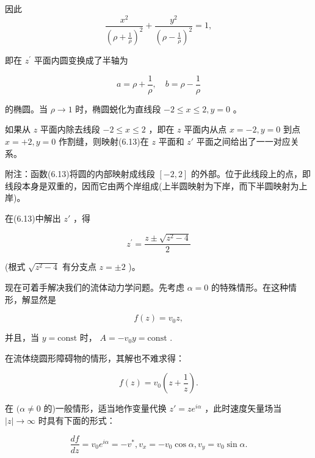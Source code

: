因此
\begin{equation*}
\frac {x ^ {2}}{\left(\rho + \frac {1}{\rho}\right) ^ {2}} + \frac {y ^ {2}}{\left(\rho - \frac {1}{\rho}\right) ^ {2}} = 1,
\end{equation*}

即在 $z^{\prime}$ 平面内圆变换成了半轴为

\begin{equation*}
a = \rho + \frac {1}{\rho}, \quad b = \rho - \frac {1}{\rho}
\end{equation*}

的椭圆。当 $\rho \to 1$ 时，椭圆蜕化为直线段 $-2 \leqslant x \leqslant 2, y = 0$ 。

如果从 $z$ 平面内除去线段 $-2 \leqslant x \leqslant 2$ ，即在 $z$ 平面内从点 $x = -2, y = 0$ 到点 $x = +2, y = 0$ 作割缝，则映射(6.13)在 $z$ 平面和 $z'$ 平面之间给出了一一对应关系。

附注：函数(6.13)将圆的内部映射成线段 $[-2,2]$ 的外部。位于此线段上的点，即线段本身是双重的，因而它由两个岸组成(上半圆映射为下岸，而下半圆映射为上岸)。

在(6.13)中解出 $z'$ ，得

\begin{equation*}
z ^ {\prime} = \frac {z \pm \sqrt {z ^ {2} - 4}}{2}\tag{6.14}
\end{equation*}

(根式 $\sqrt{z^{2}-4}$ 有分支点 $z=\pm2$ )。

现在可着手解决我们的流体动力学问题。先考虑 $\alpha = 0$ 的特殊情形。在这种情形，解显然是

\begin{equation*}
f (z) = v _ {0} z,
\end{equation*}

并且，当 $y = \mathrm{const}$ 时， $A = -v_0y = \mathrm{const}$ .

在流体绕圆形障碍物的情形，其解也不难求得：

\begin{equation*}
f (z) = v _ {0} \left(z + \frac {1}{z}\right).
\end{equation*}

在 $(\alpha \neq 0$ 的)一般情形，适当地作变量代换 $z' = ze^{i\alpha}$ ，此时速度矢量场当 $|z|\to \infty$ 时具有下面的形式：

\begin{equation*}
\frac {d f}{d z} = v _ {0} e ^ {i \alpha} = - v ^ {*}, v _ {x} = - v _ {0} \cos \alpha , v _ {y} = v _ {0} \sin \alpha .
\end{equation*}

